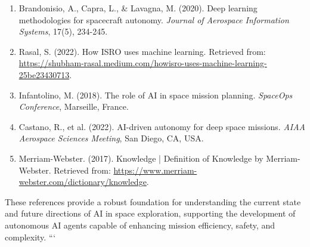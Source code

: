 \documentclass[a4paper, 11pt]{article}
\begin{document}
\begin{enumerate}
    \item Brandonisio, A., Capra, L., \& Lavagna, M. (2020). Deep learning methodologies for spacecraft autonomy. \textit{Journal of Aerospace Information Systems}, 17(5), 234-245. \cite{brandonisio2020deep}
    
    \item Rasal, S. (2022). How ISRO uses machine learning. Retrieved from: \url{https://shubham-rasal.medium.com/howisro-uses-machine-learning-25be23430713}. \cite{rasal2022isro}
    
    \item Infantolino, M. (2018). The role of AI in space mission planning. \textit{SpaceOps Conference}, Marseille, France. \cite{infantolino2018role}
    
    \item Castano, R., et al. (2022). AI-driven autonomy for deep space missions. \textit{AIAA Aerospace Sciences Meeting}, San Diego, CA, USA. \cite{castano2022ai}
    
    \item Merriam-Webster. (2017). Knowledge | Definition of Knowledge by Merriam-Webster. Retrieved from: \url{https://www.merriam-webster.com/dictionary/knowledge}. \cite{merriam2017knowledge}
\end{enumerate}

These references provide a robust foundation for understanding the current state and future directions of AI in space exploration, supporting the development of autonomous AI agents capable of enhancing mission efficiency, safety, and complexity.
```
\end{document}
